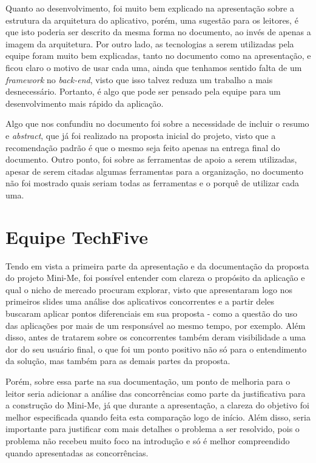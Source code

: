Quanto ao desenvolvimento, foi muito bem explicado na apresentação sobre a estrutura da arquitetura do aplicativo, porém, uma sugestão para os leitores, é que isto poderia ser descrito da mesma forma no documento, ao invés de apenas a imagem da arquitetura. Por outro lado, as tecnologias a serem utilizadas pela equipe foram muito bem explicadas, tanto no documento como na apresentação, e ficou claro o motivo de usar cada uma, ainda que tenhamos sentido falta de um \textsl{framework} no \textsl{back-end}, visto que isso talvez reduza um trabalho a mais desnecessário. Portanto, 
é algo que pode ser pensado pela equipe para um desenvolvimento mais rápido da aplicação.

Algo que nos confundiu no documento foi sobre a necessidade de incluir o resumo e \textsl{abstract}, que já foi realizado na proposta inicial do projeto, visto que a recomendação padrão é que o mesmo seja feito apenas na entrega final do documento. Outro ponto, foi sobre as ferramentas de apoio a serem utilizadas, apesar de serem citadas algumas ferramentas para a organização, no documento não foi mostrado quais seriam todas as ferramentas e o porquê de utilizar cada uma.

\section{Equipe TechFive}
Tendo em vista a primeira parte da apresentação e da documentação da proposta do projeto Mini-Me, foi possível entender com clareza o propósito da aplicação e qual o nicho de mercado procuram explorar, visto que apresentaram logo nos primeiros slides uma análise dos aplicativos concorrentes e a partir deles buscaram aplicar pontos diferenciais em sua proposta - como a questão do uso das aplicações por mais de um responsável ao mesmo tempo, por exemplo. Além disso, antes de tratarem sobre os concorrentes também deram visibilidade a uma dor do seu usuário final, o que foi um ponto positivo não só para o entendimento da solução, mas também para as demais partes da proposta.

Porém, sobre essa parte na sua documentação, um ponto de melhoria para o leitor seria adicionar a análise das concorrências como parte da justificativa para a construção do Mini-Me, já que durante a apresentação, a clareza do objetivo foi melhor especificada quando feita esta comparação logo de início. Além disso, seria importante para justificar com mais detalhes o problema a ser resolvido, pois o problema não recebeu muito foco na introdução e só é melhor compreendido quando apresentadas as concorrências.

